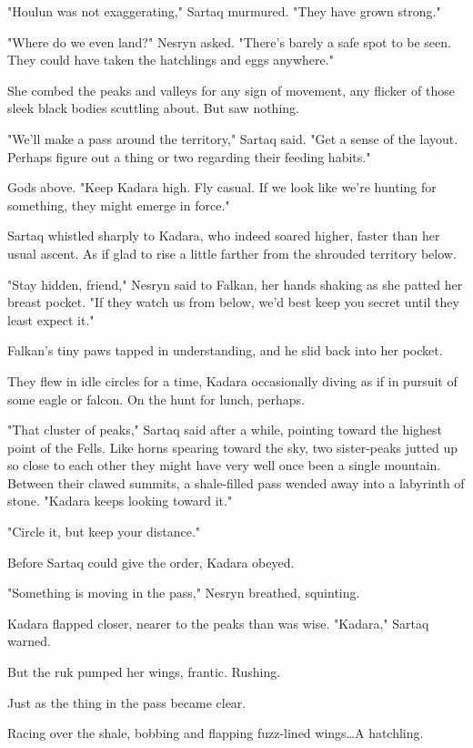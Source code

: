 "Houlun was not exaggerating," Sartaq murmured.
"They have grown strong."

"Where do we even land?"
Nesryn asked.
"There's barely a safe spot to be seen.
They could have taken the hatchlings and eggs anywhere."

She combed the peaks and valleys for any sign of movement, any flicker of those sleek black bodies scuttling about.
But saw nothing.

"We'll make a pass around the territory," Sartaq said.
"Get a sense of the layout.
Perhaps figure out a thing or two regarding their feeding habits."

Gods above.
"Keep Kadara high.
Fly casual.
If we look like we're hunting for something, they might emerge in force."

Sartaq whistled sharply to Kadara, who indeed soared higher, faster than her usual ascent.
As if glad to rise a little farther from the shrouded territory below.

"Stay hidden, friend," Nesryn said to Falkan, her hands shaking as she patted her breast pocket.
"If they watch us from below, we'd best keep you secret until they least expect it."

Falkan's tiny paws tapped in understanding, and he slid back into her pocket.

They flew in idle circles for a time, Kadara occasionally diving as if in pursuit of some eagle or falcon.
On the hunt for lunch, perhaps.

"That cluster of peaks," Sartaq said after a while, pointing toward the highest point of the Fells.
Like horns spearing toward the sky, two sister-peaks jutted up so close to each other they might have very well once been a single mountain.
Between their clawed summits, a shale-filled pass wended away into a labyrinth of stone.
"Kadara keeps looking toward it."

"Circle it, but keep your distance."

Before Sartaq could give the order, Kadara obeyed.

"Something is moving in the pass," Nesryn breathed, squinting.

Kadara flapped closer, nearer to the peaks than was wise.
"Kadara," Sartaq warned.

But the ruk pumped her wings, frantic.
Rushing.

Just as the thing in the pass became clear.

Racing over the shale, bobbing and flapping fuzz-lined wings\ldots A hatchling.

